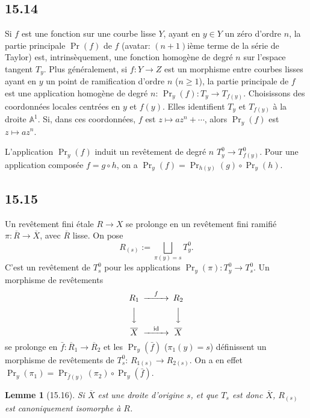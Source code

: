 \documentclass[12pt,a4paper]{article}
\theoremstyle{plain}
\newtheorem{lemma}[theorem]{Lemme}
\theoremstyle{definition}
\theoremstyle{remark}
\DeclareMathOperator{\id}{id}
\newcommand{\bA}{\mathbb{A}}
\begin{document}
\subsection*{15.14}

Si $f$ est une fonction sur une courbe lisse $Y$, ayant en $y \in Y$ un zéro d'ordre $n$, la partie principale $\Pr(f)$ de $f$ (avatar: $(n+1)$ième terme de la série de Taylor) est, intrinsèquement, une fonction homogène de degré $n$ sur l'espace tangent $T_y$. Plus généralement, si $f: Y \to Z$ est un morphisme entre courbes lisses ayant en $y$ un point de ramification d'ordre $n$ ($n \geqslant 1$), la partie principale de $f$ est une application homogène de degré $n$: $\Pr_y(f) : T_y \to T_{f(y)}$. Choisissons des coordonnées locales centrées en $y$ et $f(y)$. Elles identifient $T_y$ et $T_{f(y)}$ à la droite $\bA^1$. Si, dans ces coordonnées, $f$ est $z \mapsto az^n + \cdots$, alors $\Pr_y(f)$ est $z \mapsto az^n$.

L'application $\Pr_y(f)$ induit un revêtement de degré $n$ $T_y^0 \to T_{f(y)}^0$. Pour une application composée $f = g \circ h$, on a $\Pr_y(f) = \Pr_{h(y)}(g) \circ \Pr_y(h)$.

\subsection*{15.15}

Un revêtement fini étale $R \to X$ se prolonge en un revêtement fini ramifié $\pi : \overline{R} \to \overline{X}$, avec $\overline{R}$ lisse. On pose
\[
R_{(s)} := \bigsqcup_{\pi(y) = s} T_y^0.
\]
C'est un revêtement de $T_s^0$ pour les applications $\Pr_y(\pi) : T_y^0 \to T_s^0$. Un morphisme de revêtements
\[
\begin{CD}
R_1 @>{f}>> R_2 \\
@VVV @VVV \\
\overline{X} @>{\id}>> \overline{X}
\end{CD}
\]
se prolonge en $\bar{f} : \overline{R}_1 \to \overline{R}_2$ et les $\Pr_y(\bar{f})$ ($\pi_1(y) = s$) définissent un morphisme de revêtements de $T_s^0$: $R_{1(s)} \to R_{2(s)}$. On a en effet $\Pr_y(\pi_1) = \Pr_{\bar{f}(y)}(\pi_2) \circ \Pr_y(\bar{f})$.

\begin{lemma}[15.16]
Si $\overline{X}$ est une droite d'origine $s$, et que $T_s$ est donc $\overline{X}$, $R_{(s)}$ est canoniquement isomorphe à $R$.
\end{lemma}
\end{document}
